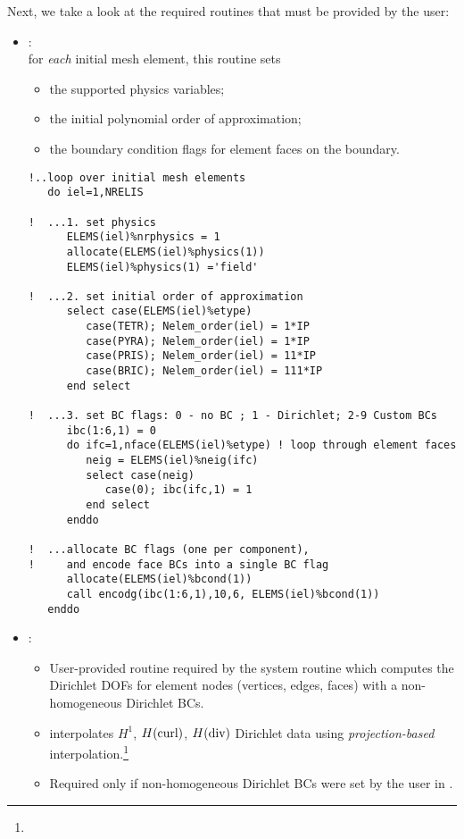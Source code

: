 Next, we take a look at the required routines that must be provided by the user:
\begin{itemize}
	\itemsep 0pt
	\item
	{:\\
	for \emph{each} initial mesh element, this routine sets
	\begin{itemize}
		\itemsep 0pt
		\item the supported physics variables;
		\item the initial polynomial order of approximation;
		\item the boundary condition flags for element faces on the boundary.
	\end{itemize}
\begin{lstlisting}[caption=\file{POISSON/GALERKIN/}\routine{set\_initial\_mesh} routine.]
!..loop over initial mesh elements
   do iel=1,NRELIS

!  ...1. set physics
      ELEMS(iel)%nrphysics = 1
      allocate(ELEMS(iel)%physics(1))
      ELEMS(iel)%physics(1) ='field'

!  ...2. set initial order of approximation
      select case(ELEMS(iel)%etype)
         case(TETR); Nelem_order(iel) = 1*IP
         case(PYRA); Nelem_order(iel) = 1*IP
         case(PRIS); Nelem_order(iel) = 11*IP
         case(BRIC); Nelem_order(iel) = 111*IP
      end select

!  ...3. set BC flags: 0 - no BC ; 1 - Dirichlet; 2-9 Custom BCs
      ibc(1:6,1) = 0
      do ifc=1,nface(ELEMS(iel)%etype) ! loop through element faces
         neig = ELEMS(iel)%neig(ifc)
         select case(neig)
            case(0); ibc(ifc,1) = 1
         end select
      enddo

!  ...allocate BC flags (one per component), 
!     and encode face BCs into a single BC flag
      allocate(ELEMS(iel)%bcond(1))
      call encodg(ibc(1:6,1),10,6, ELEMS(iel)%bcond(1))
   enddo
\end{lstlisting}
	}
	\item
	{:
	\begin{itemize}
	\item User-provided routine required by the system routine  which computes the Dirichlet DOFs for element nodes (vertices, edges, faces) with a non-homogeneous Dirichlet BCs. 
	\item {} interpolates $H^1$, $H(\text{curl})$, $H(\text{div})$ Dirichlet data using \emph{projection-based} interpolation.\footnote{}
	\item Required only if non-homogeneous Dirichlet BCs were set by the user in .
\end{itemize}

}
\end{itemize}
